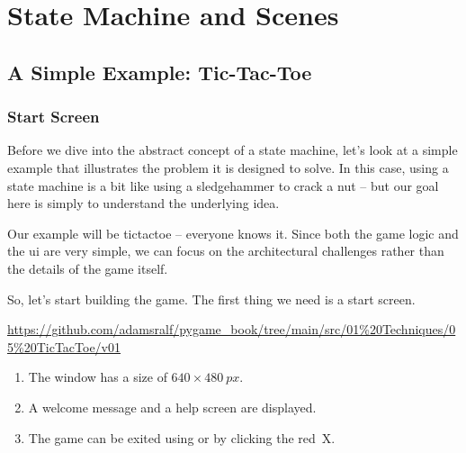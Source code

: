 \newpage
\section{State Machine and Scenes}\label{secStateMachine}

\subsection{A Simple Example: Tic-Tac-Toe}

\subsubsection{Start Screen}

\begin{figure}%
	\begin{center}%
		\vspace{-2em}%
	\end{center}%
\end{figure}%
Before we dive into the abstract concept of a state machine, let's look at a simple example that illustrates the problem it is designed to solve. In this case, using a state machine is a bit like using a sledgehammer to crack a nut -- but our goal here is simply to understand the underlying idea.

Our example will be \Gls{tictactoe} -- everyone knows it. Since both the game logic and the \Gls{ui} are very simple, we can focus on the architectural challenges rather than the details of the game itself.

So, let's start building the game. The first thing we need is a start screen.
 

\begin{diskbox}
	\url{https://github.com/adamsralf/pygame_book/tree/main/src/01%20Techniques/05%20TicTacToe/v01}
\end{diskbox}

\begin{enumerate}
	\item The window has a size of $640\times \SI{480}{px}$.\label{reqTicTacToeStartSize}
	\item A welcome message and a help screen are displayed.\label{reqTicTacToeStartText}
	\item The game can be exited using \keys{\esc} or by clicking the red~X.\label{reqTicTacToeStartQuit}
\end{enumerate}
\er


